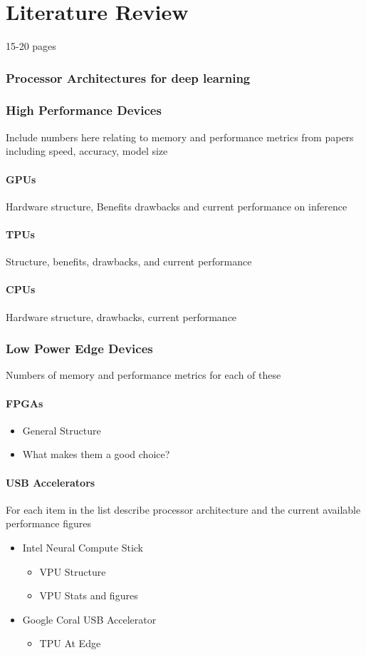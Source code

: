 \chapter{Literature Review}
\label{LiteratureReview} 
15-20 pages
\subsection{Processor Architectures for deep learning}

\subsection{High Performance Devices}
Include numbers here relating to memory and performance metrics from papers including speed, accuracy, model size
\subsubsection{GPUs}
Hardware structure, Benefits drawbacks and current performance on inference
\subsubsection{TPUs}
Structure, benefits, drawbacks, and current performance
\subsubsection{CPUs}
Hardware structure, drawbacks, current performance

\subsection{Low Power Edge Devices}
Numbers of memory and performance metrics for each of these
\subsubsection{FPGAs}
\begin{itemize}
\item
General Structure
\item
What makes them a good choice?
\end{itemize}

\subsubsection{USB Accelerators}
For each item in the list describe processor architecture and the current available performance figures
\begin{itemize}
\item
Intel Neural Compute Stick 
\begin{itemize}
\item
VPU Structure
\item
VPU Stats and figures
\end{itemize}
\item
Google Coral USB Accelerator
\begin{itemize}
\item
TPU At Edge

\end{itemize}
	

\end{itemize}

